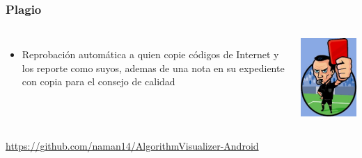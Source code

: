\begin{frame}
\frametitle{Plagio}
\begin{columns}[c] %
\begin{itemize}
\item Reprobación automática a quien copie códigos de Internet y los reporte como suyos, ademas de una nota en su expediente con copia para el consejo de calidad 
\end{itemize}
\begin{center}
\includegraphics[scale=0.27]{Plagio/tarjeta-roja.jpg}
\end{center}
\end{columns}
\href{https://github.com/naman14/AlgorithmVisualizer-Android}{https://github.com/naman14/AlgorithmVisualizer-Android}


\end{frame}
